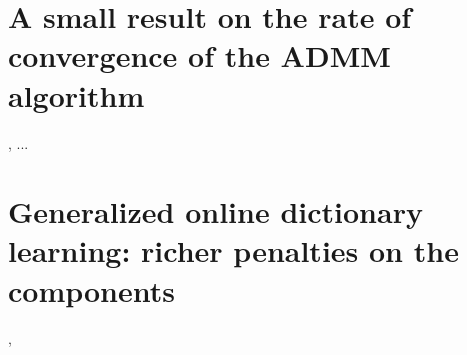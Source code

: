 
\section{A small result on the rate of convergence of the ADMM algorithm}
 \citep{dohmatob2015local}, ...


\section{Generalized online dictionary learning: richer penalties on the components}
 \citep{dohmatob2016},






